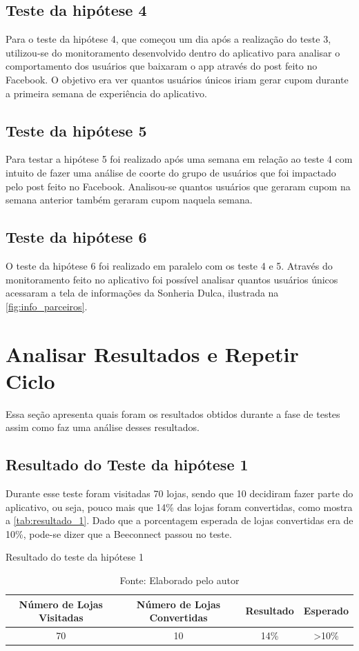 \subsection{Teste da hipótese 4}
\label{cha:teste_4}
Para o teste da hipótese 4, que começou um dia após a realização do teste 3, utilizou-se do monitoramento desenvolvido dentro do aplicativo para analisar o comportamento dos usuários que baixaram o app através do post feito no Facebook. O objetivo era ver quantos usuários únicos iriam gerar cupom durante a primeira semana de experiência do aplicativo.

\subsection{Teste da hipótese 5}
\label{cha:teste_5}
Para testar a hipótese 5 foi realizado após uma semana em relação ao teste 4 com intuito de fazer uma análise de coorte do grupo de usuários que foi impactado pelo post feito no Facebook. Analisou-se quantos usuários que geraram cupom na semana anterior também geraram cupom naquela semana.

\subsection{Teste da hipótese 6}
\label{cha:teste_6}
O teste da hipótese 6 foi realizado em paralelo com os teste 4 e 5. Através do monitoramento feito no aplicativo foi possível analisar quantos usuários únicos acessaram a tela de informações da Sonheria Dulca, ilustrada na \autoref{fig:info_parceiros}.

\section{Analisar Resultados e Repetir Ciclo}
\label{cha:analisar_resultados}
Essa seção apresenta quais foram os resultados obtidos durante a fase de testes assim como faz uma análise desses resultados.

\subsection{Resultado do Teste da hipótese 1}
\label{cha:resultado_1}
Durante esse teste foram visitadas 70 lojas, sendo que 10 decidiram fazer parte do aplicativo, ou seja, pouco mais que 14\% das lojas foram convertidas, como mostra a \autoref{tab:resultado_1}. Dado que a porcentagem esperada de lojas convertidas era de 10\%, pode-se dizer que a Beeconnect passou no teste.
\begin{table}[H]
\centering
\caption{Resultado do teste da hipótese 1}
\label{tab:resultado_1}
\begin{tabular}{|c|c|c|c|}
\hline
Número de Lojas Visitadas & Número de Lojas Convertidas & Resultado & Esperado          \\ \hline
70                        & 10                          & 14\%      & \textgreater 10\% \\ \hline
\end{tabular}
\caption* {Fonte: Elaborado pelo autor}    
\end{table}

